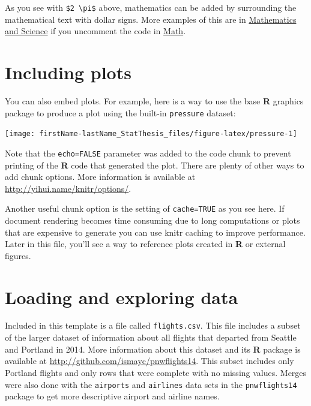 \documentclass[12pt, twoside]{amherstthesis}
\theoremstyle{definition}
\theoremstyle{definition}
\theoremstyle{definition}
\theoremstyle{remark}
\begin{document}
As you see with \texttt{\$2\ \textbackslash{}pi\$} above, mathematics can be added by surrounding the mathematical text with dollar signs. More examples of this are in \protect\hyperlink{math-sci}{Mathematics and Science} if you uncomment the code in \protect\hyperlink{math}{Math}.

\hypertarget{including-plots}{%
\section{Including plots}\label{including-plots}}

You can also embed plots. For example, here is a way to use the base \textbf{R} graphics package to produce a plot using the built-in \texttt{pressure} dataset:
\begin{center}\texttt{[image: firstName-lastName\_StatThesis\_files/figure-latex/pressure-1]} \end{center}

Note that the \texttt{echo=FALSE} parameter was added to the code chunk to prevent printing of the \textbf{R} code that generated the plot. There are plenty of other ways to add chunk options. More information is available at \url{http://yihui.name/knitr/options/}.

Another useful chunk option is the setting of \texttt{cache=TRUE} as you see here. If document rendering becomes time consuming due to long computations or plots that are expensive to generate you can use knitr caching to improve performance. Later in this file, you'll see a way to reference plots created in \textbf{R} or external figures.

\hypertarget{loading-and-exploring-data}{%
\section{Loading and exploring data}\label{loading-and-exploring-data}}

Included in this template is a file called \texttt{flights.csv}. This file includes a subset of the larger dataset of information about all flights that departed from Seattle and Portland in 2014. More information about this dataset and its \textbf{R} package is available at \url{http://github.com/ismayc/pnwflights14}. This subset includes only Portland flights and only rows that were complete with no missing values. Merges were also done with the \texttt{airports} and \texttt{airlines} data sets in the \texttt{pnwflights14} package to get more descriptive airport and airline names.
\end{document}
